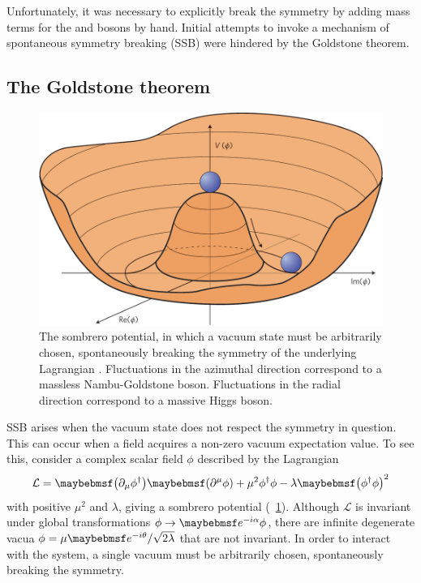 Unfortunately, it was necessary to explicitly break the symmetry by adding mass terms for 
the \PWpm and \PZ bosons by hand. Initial attempts to invoke a mechanism of spontaneous 
symmetry breaking (SSB) were hindered by the Goldstone theorem.



\subsection{The Goldstone theorem}
\label{sec:ewsb:goldstone}

\begin{figure}[t]
	\includegraphics[width=\mediumfigwidth]{tex/motivation/sombrero}
	\caption{The sombrero potential, in which a vacuum state must be arbitrarily chosen, 
	spontaneously breaking the symmetry of the underlying Lagrangian \cite{Alvarez:2011}.
	Fluctuations in the azimuthal direction correspond to a massless Nambu-Goldstone 
	boson. Fluctuations in the radial direction correspond to a massive Higgs boson. 
	\href{http://www.nature.com/nphys/index.html}{}}
	\label{fig:sombrero}
\end{figure}

SSB arises when the vacuum state does not respect the symmetry in question. This can 
occur when a field acquires a non-zero vacuum expectation value. To see this, consider a 
complex scalar field $\phi$ described by the Lagrangian
\begin{equation}
	\mathcal{L} 
	= \parenths{\partial_{\mu}\phi^{\dagger}} \parenths{\partial^{\mu}\phi} 
	+ \mu^2 \phi^{\dagger}\phi - \lambda \parenths{\phi^{\dagger}\phi}^2
	\label{eq:lagr:goldstone}
\end{equation}
with positive $\mu^2$ and $\lambda$, giving a sombrero potential 
(\Figure~\ref{fig:sombrero}). 
Although $\mathcal{L}$ is invariant under global  transformations 
$\phi \rightarrow \eexp{-i\alpha} \phi$, there are infinite degenerate vacua
$\phi = \mu\eexp{-i\theta}/\sqrt{2\lambda}$ that are not invariant. In order to interact 
with the system, a single vacuum must be arbitrarily chosen, spontaneously breaking the 
 symmetry.

